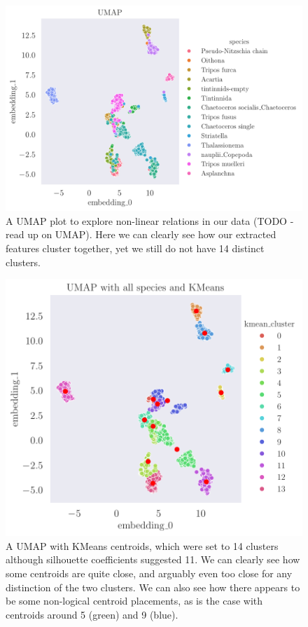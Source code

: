 \begin{figure}[H]
    \centering
    \includegraphics[width=1.1\linewidth]{examples/tests_eb/figs/umap.pdf}
    \caption{A UMAP plot to explore non-linear relations in our data (TODO - read up on UMAP). Here we can clearly see how our extracted features cluster together, yet we still do not have 14 distinct clusters.}
    \label{fig:umap}
\end{figure}

\begin{figure}[H]
    \centering
    \includegraphics[width=1\linewidth]{latex/figures/kmeans_cluster_umap_on_all_species.pdf}
    \caption{A UMAP with KMeans centroids, which were set to 14 clusters although silhouette coefficients suggested 11. We can clearly see how some centroids are quite close, and arguably even too close for any distinction of the two clusters. We can also see how there appears to be some non-logical centroid placements, as is the case with centroids around 5 (green) and 9 (blue).}
    \label{fig:14-mer-umap}
\end{figure}

